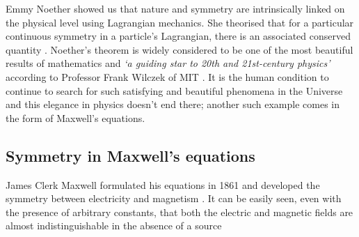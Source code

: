 \documentclass[fleqn, twocolumn, 10pt]{article}
\begin{document}
Emmy Noether showed us that nature and symmetry are intrinsically linked on the physical level using Lagrangian mechanics. She theorised that for a particular continuous symmetry in a particle's Lagrangian, there is an associated conserved quantity \cite{bob2017purdy}. Noether's theorem is widely considered to be one of the most beautiful results of mathematics and \textit{`a guiding star to 20th and 21st-century physics'} according to Professor Frank Wilczek of MIT \cite{scinews}. It is the human condition to continue to search for such satisfying and beautiful phenomena in the Universe and this elegance in physics doesn't end there; another such example comes in the form of Maxwell's equations.

\subsection{Symmetry in Maxwell's equations}
James Clerk Maxwell formulated his equations in 1861 and developed the symmetry between electricity and magnetism \cite{maxwell1861li}. It can be easily seen, even with the presence of arbitrary constants, that both the electric and magnetic fields are almost indistinguishable in the absence of a source 
\end{document}
